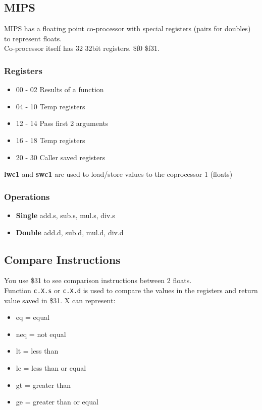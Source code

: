 \documentclass{article}
\newcommand\tab[1][0.5cm]{\hspace*{#1}}
\begin{document}
	\subsection*{MIPS}
		MIPS has a floating point co-processor with special registers (pairs for doubles) to represent floats.\\

		Co-processor itself has 32 32bit registers. \$f0 \$f31.

		\subsubsection*{Registers}
		\begin{itemize}
			\item 00 - 02 \tab Results of a function
			\item 04 - 10 \tab Temp registers
			\item 12 - 14 \tab Pass first 2 arguments
			\item 16 - 18 \tab Temp registers
			\item 20 - 30 \tab Caller saved registers
		\end{itemize}

		\textbf{lwc1} and \textbf{swc1} are used to load/store values to the coprocessor 1 (floats)

		\subsubsection*{Operations}
		\begin{itemize}
			\item \textbf{Single} \tab add.s, sub.s, mul.s, div.s
			\item \textbf{Double} \tab add.d, sub.d, mul.d, div.d
		\end{itemize}

	\subsection*{Compare Instructions}
		You use \$31 to see comparison instructions between 2 floats.\\

		Function \texttt{c.X.s} or \texttt{c.X.d} is used to compare the values in the registers and return value saved in \$31. X can represent:
		\begin{itemize}
			\item eq = equal
			\item neq = not equal
			\item lt = less than
			\item le = less than or equal
			\item gt = greater than
			\item ge = greater than or equal
		\end{itemize}
\end{document}
